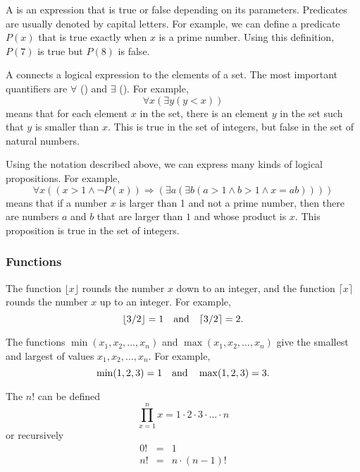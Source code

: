 A  is an expression that is true or false
depending on its parameters.
Predicates are usually denoted by capital letters.
For example, we can define a predicate $P(x)$
that is true exactly when $x$ is a prime number.
Using this definition, $P(7)$ is true but $P(8)$ is false.


A  connects a logical expression
to the elements of a set.
The most important quantifiers are
$\forall$ () and $\exists$ ().
For example,
\[\forall x (\exists y (y < x))\]
means that for each element $x$ in the set,
there is an element $y$ in the set
such that $y$ is smaller than $x$.
This is true in the set of integers,
but false in the set of natural numbers.

Using the notation described above,
we can express many kinds of logical propositions.
For example,
\[\forall x ((x>1 \land \lnot P(x)) \Rightarrow (\exists a (\exists b (a > 1 \land b > 1 \land x = ab))))\]
means that if a number $x$ is larger than 1
and not a prime number,
then there are numbers $a$ and $b$
that are larger than $1$ and whose product is $x$.
This proposition is true in the set of integers.

\subsubsection{Functions}

The function $\lfloor x \rfloor$ rounds the number $x$
down to an integer, and the function
$\lceil x \rceil$ rounds the number $x$
up to an integer. For example,
\[ \lfloor 3/2 \rfloor = 1 \hspace{10px} \textrm{and} \hspace{10px} \lceil 3/2 \rceil = 2.\]

The functions $\min(x_1,x_2,\ldots,x_n)$
and $\max(x_1,x_2,\ldots,x_n)$
give the smallest and largest of values
$x_1,x_2,\ldots,x_n$.
For example,
\[ \min(1,2,3)=1 \hspace{10px} \textrm{and} \hspace{10px} \max(1,2,3)=3.\]


The  $n!$ can be defined
\[\prod_{x=1}^n x = 1 \cdot 2 \cdot 3 \cdot \ldots \cdot n\]
or recursively
\[
\begin{array}{lcl}
0! & = & 1 \\
n! & = & n \cdot (n-1)! \\
\end{array}
\]


